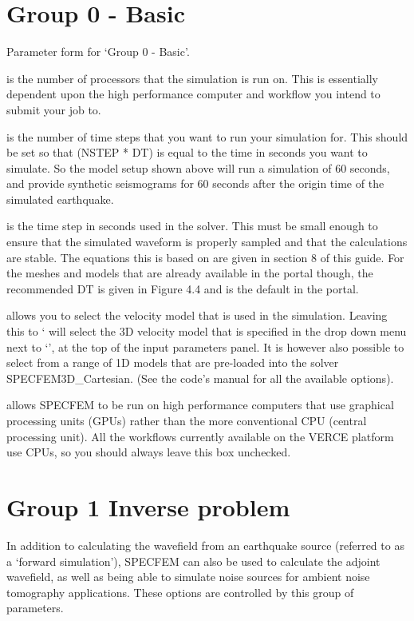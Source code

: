 \documentclass[english]{book}
\begin{document}
\section{Group 0 - Basic}
\label{\detokenize{Appendix1:a1-1-group-0-basic}}

 Parameter form for ‘Group 0 - Basic’.

 is the number of processors that the simulation is run on.
This is essentially dependent upon the high performance computer and
workflow you intend to submit your job to.

 is the number of time steps that you want to run your
simulation for. This should be set so that (NSTEP * DT) is equal to the
time in seconds you want to simulate. So the model setup shown above
will run a simulation of 60 seconds, and provide synthetic seismograms
for 60 seconds after the origin time of the simulated earthquake.

 is the time step in seconds used in the solver. This must be
small enough to ensure that the simulated waveform is properly sampled
and that the calculations are stable. The equations this is based on are
given in section 8 of this guide. For the meshes and models that are
already available in the portal though, the recommended DT is given in
Figure 4.4 and is the default in the portal.

 allows you to select the velocity model that is used in the
simulation. Leaving this to ‘ will select the 3D velocity
model that is specified in the drop down menu next to ‘’, at the top of the input parameters panel. It is however also
possible to select from a range of 1D models that are pre-loaded into
the solver SPECFEM3D\_Cartesian. (See the code’s manual for all the
available options).

 allows SPECFEM to be run on high performance computers
that use graphical processing units (GPUs) rather than the more
conventional CPU (central processing unit). All the workflows currently
available on the VERCE platform use CPUs, so you should always leave
this box unchecked.


\section{Group 1 \textendash{} Inverse problem}
\label{\detokenize{Appendix1:a1-2-group-1-inverse-problem}}
In addition to calculating the wavefield from an earthquake source
(referred to as a ‘forward simulation’), SPECFEM can also be used to
calculate the adjoint wavefield, as well as being able to simulate noise
sources for ambient noise tomography applications. These options are
controlled by this group of parameters.
\end{document}
